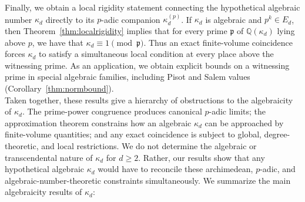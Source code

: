 \documentclass{article}
\theoremstyle{plain}
\theoremstyle{definition}
\theoremstyle{remark}
\begin{document}
Finally, we obtain a local rigidity statement connecting the hypothetical
algebraic number $\kappa_d$ directly to its $p$-adic companion $\kappa_d^{(p)}$. If
$\kappa_d$ is algebraic and $p^k\in E_d$, then
Theorem~\ref{thm:localrigidity} implies that for every prime
$\mathfrak p$ of $\mathbb Q(\kappa_d)$ lying above $p$, we have that $\kappa_d\equiv1\pmod{\mathfrak p}$. Thus an exact finite-volume coincidence forces $\kappa_d$ to satisfy a
simultaneous local condition at every place above the witnessing prime.
As an application, we obtain explicit bounds on a witnessing prime in
special algebraic families, including Pisot and Salem values
(Corollary~\ref{thm:normbound}).\\

Taken together, these results give a hierarchy of obstructions to the
algebraicity of $\kappa_d$. The prime-power congruence produces canonical
$p$-adic limits; the approximation theorem constrains how an algebraic
$\kappa_d$ can be approached by finite-volume quantities; and any exact
coincidence is subject to global, degree-theoretic, and local restrictions.
We do not determine the algebraic or transcendental nature of $\kappa_d$ for
$d\geq2$. Rather, our results show that any hypothetical algebraic
$\kappa_d$ would have to reconcile these archimedean, $p$-adic, and
algebraic-number-theoretic constraints simultaneously. We summarize the main algebraicity results of $\kappa_d$:
\end{document}
